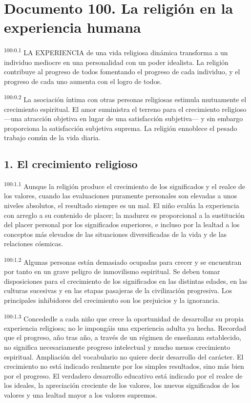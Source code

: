 \chapter{Documento 100. La religión en la experiencia humana}
\par
\textsuperscript{100:0.1} LA EXPERIENCIA de una vida religiosa dinámica transforma a un individuo mediocre en una personalidad con un poder idealista. La religión contribuye al progreso de todos fomentando el progreso de cada individuo, y el progreso de cada uno aumenta con el logro de todos.

\par
\textsuperscript{100:0.2} La asociación íntima con otras personas religiosas estimula mutuamente el crecimiento espiritual. El amor suministra el terreno para el crecimiento religioso ---una atracción objetiva en lugar de una satisfacción subjetiva--- y sin embargo proporciona la satisfacción subjetiva suprema. La religión ennoblece el pesado trabajo común de la vida diaria.

\section*{1. El crecimiento religioso}
\par
\textsuperscript{100:1.1} Aunque la religión produce el crecimiento de los significados y el realce de los valores, cuando las evaluaciones puramente personales son elevadas a unos niveles absolutos, el resultado siempre es un mal. El niño evalúa la experiencia con arreglo a su contenido de placer; la madurez es proporcional a la sustitución del placer personal por los significados superiores, e incluso por la lealtad a los conceptos más elevados de las situaciones diversificadas de la vida y de las relaciones cósmicas.

\par
\textsuperscript{100:1.2} Algunas personas están demasiado ocupadas para crecer y se encuentran por tanto en un grave peligro de inmovilismo espiritual. Se deben tomar disposiciones para el crecimiento de los significados en las distintas edades, en las culturas sucesivas y en las etapas pasajeras de la civilización progresiva. Los principales inhibidores del crecimiento son los prejuicios y la ignorancia.

\par
\textsuperscript{100:1.3} Concededle a cada niño que crece la oportunidad de desarrollar su propia experiencia religiosa; no le impongáis una experiencia adulta ya hecha. Recordad que el progreso, año tras año, a través de un régimen de enseñanza establecido, no significa necesariamente progreso intelectual y mucho menos crecimiento espiritual. Ampliación del vocabulario no quiere decir desarrollo del carácter. El crecimiento no está indicado realmente por los simples resultados, sino más bien por el progreso. El verdadero desarrollo educativo está indicado por el realce de los ideales, la apreciación creciente de los valores, los nuevos significados de los valores y una lealtad mayor a los valores supremos.

